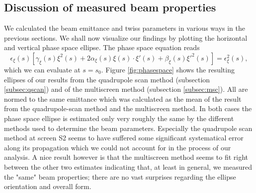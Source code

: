\documentclass[11pt,a4paper,notitlepage]{scrartcl}
\begin{document}
\subsection{Discussion of measured beam properties}
We calculated the beam emittance and twiss parameters in various ways in the previous sections. We shall now visualize our findings by plotting the horizontal and vertical phase space ellipse. The phase space equation reads \cite{wille} 
\begin{equation}
	\epsilon_\xi(s)\left[\gamma_\xi(s)\xi^2(s)+2\alpha_\xi(s)\xi(s)\cdot\xi'(s)+\beta_\xi(s)\xi'^2(s)\right]=\epsilon_\xi^2(s),	
\end{equation}
which we can evaluate at $s=s_0$. Figure \ref{fig:phasespace} shows the resulting ellipses of our results from the quadrupole scan method (subsection \ref{subsec:qscan}) and of the multiscreen method (subsection \ref{subsec:msc}). All are normed to the same emittance which was calculated as the mean of the result from the quadrupole-scan method and the multiscreen method. In both cases the phase space ellipse is estimated only very roughly the same by the different methods used to determine the beam parameters. Especially the quadrupole scan method at screen S2 seems to have suffered some significant systematical error along its propagation which we could not account for in the process of our analysis. A nice result however is that the multiscreen method seems to fit right between the other two estimates indicating that, at least in general, we measured the "same" beam properties; there are no vast surprises regarding the ellipse orientation and overall form. 
\end{document}
